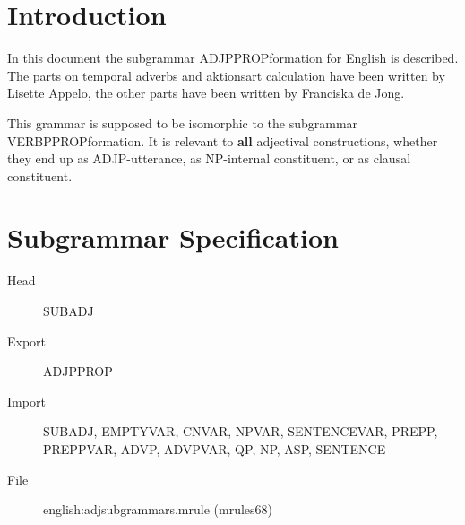 

   \RosDate{\today}
   \RosSupersedes{-}
   \MakeRosTitle
%
%


\section{Introduction}
In this document the subgrammar ADJPPROPformation for English is described.
The parts on temporal adverbs and aktionsart calculation have been written by 
Lisette Appelo, the other parts have been written by Franciska de Jong.

This grammar is supposed to be isomorphic to the 
subgrammar VERBPPROPformation. It is relevant to {\bf all} 
adjectival constructions, 
whether they end up as ADJP-utterance, as NP-internal constituent, or as
clausal constituent.


\section{Subgrammar Specification}

\begin{description}
  \item[Head] SUBADJ
  \item[Export] ADJPPROP
  \item[Import] SUBADJ, EMPTYVAR, CNVAR, NPVAR, SENTENCEVAR, PREPP, PREPPVAR,
ADVP, ADVPVAR, QP, NP, ASP, SENTENCE

  \item[File] english:adjsubgrammars.mrule (mrules68)
\end{description}

